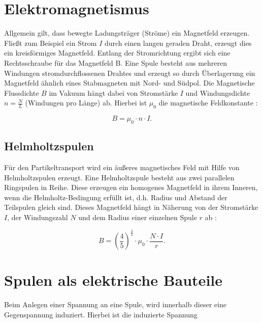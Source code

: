 \documentclass[page,pdftex,12pt,a4paper,twoside,openright]{scrbook}
\begin{document}
\section{Elektromagnetismus \label{sec-elektromagnetismus}}
\label{sec:orgb610123}
Allgemein gilt, dass bewegte Ladungsträger (Ströme) ein Magnetfeld erzeugen. Fließt zum Beispiel ein Strom \(I\) durch einen langen geraden Draht, erzeugt dies ein kreisförmiges Magnetfeld. Entlang der Stromrichtung ergibt sich eine Rechtsschraube für das Magnetfeld B. Eine Spule besteht aus mehreren Windungen stromdurchflossenen Drahtes und erzeugt so durch Überlagerung ein Magnetfeld ähnlich eines Stabmagneten mit Nord- und Südpol. Die Magnetische Flussdichte \(B\) im Vakuum hängt dabei von Stromstärke \(I\) und Windungsdichte \(n = \frac{N}{L}\) (Windungen pro Länge) ab. Hierbei ist \(\mu_\mathrm{0}\) die magnetische Feldkonstante \cite{demtroder_experimentalphysik_2017}:

\begin{equation}
\label{eq-spule}
B = \mu_{\mathrm{0}} \cdot n \cdot I .
\end{equation}

\subsection{Helmholtzspulen}
\label{sec:org633e96d}
Für den Partikeltransport wird ein äußeres magnetisches Feld mit Hilfe von Helmholtzspulen erzeugt. Eine Helmholtzspule besteht aus zwei parallelen Ringspulen in Reihe. Diese erzeugen ein homogenes Magnetfeld in ihrem Inneren, wenn die Helmholtz-Bedingung erfüllt ist, d.h. Radius und Abstand der Teilspulen gleich sind. Dieses Magnetfeld hängt in Näherung von der Stromstärke \(I\), der Windungszahl \(N\) und dem Radius einer einzelnen Spule \(r\) ab \cite{reginka_charakterisierung_2015}:

\begin{equation}
\label{eq-helmholtz}
B = \left(\frac{4}{5}\right)^{\frac{3}{2}} \cdot \mu_{\mathrm{0}} \cdot \frac{N \cdot I}{r} .
\end{equation}

\section{Spulen als elektrische Bauteile \label{sec-spulen}}
\label{sec:org6eb03ce}
Beim Anlegen einer Spannung an eine Spule, wird innerhalb dieser eine Gegenspannung induziert. Hierbei ist die induzierte Spannung
\end{document}
